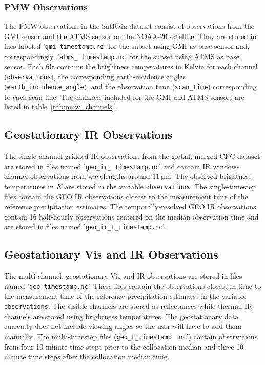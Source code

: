 \documentclass[11pt]{article}
\begin{document}
\subsubsection{PMW Observations}

The PMW observations in the SatRain dataset consist of observations from the GMI
sensor and the ATMS sensor on the NOAA-20 satellite. They are stored in files
labeled '\texttt{gmi\_\textlangle timestamp\textrangle.nc}' for the subset using
GMI as base sensor and, correspondingly, '\texttt{atms\_\textlangle
  timestamp\textrangle.nc}' for the subset using ATMS as base sensor. Each file
contains the brightness temperatures in Kelvin for each channel (\texttt{observations}), the
corresponding earth-incidence angles (\texttt{earth\_incidence\_angle}), and the observation time (\texttt{scan\_time}) corresponding to
each scan line. The channels included for the GMI and ATMS sensors are listed in
table~\ref{tab:pmw_channels}.

\subsection{Geostationary IR Observations}

The single-channel gridded IR observations from the global, merged CPC dataset
\citep{NCEP_CPC_L3_IR} are stored in files named '\texttt{geo\_ir\_\textlangle
  timestamp\textrangle.nc}' and contain IR window-channel observations from
  wavelengths around $\SI{11}{\micro \meter}$. The observed brightness
  temperatures in $\si{K}$ are stored in the variable \texttt{observations}. The
  single-timestep files contain the GEO IR observations closest to the
  measurement time of the reference precipitation estimates. The
  temporally-resolved GEO IR observations contain 16 half-hourly observations
  centered on the median observation time and are stored in files named
  '\texttt{geo\_ir\_t\_\textlangle timestamp\textrangle.nc}'.

\subsection{Geostationary Vis and IR Observations}

The multi-channel, geostationary Vis and IR observations are stored in files
named '\texttt{geo\_\textlangle timestamp\textrangle.nc}'. These files contain
  the observations closest in time to the measurement time of the reference
  precipitation estimates in the variable \texttt{observations}. The visible
  channels are stored as reflectances while thermal IR channels are stored using
  brightness temperatures. The geostationary data currently does not include
  viewing angles so the user will have to add them manually. The multi-timestep
  files (\texttt{geo\_t\_\textlangle timestamp \textrangle.nc}') contain
  observations from four 10-minute time steps prior to the collocation median
  and three 10-minute time steps after the collocation median time.
\end{document}
